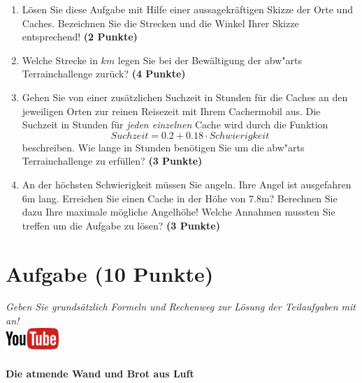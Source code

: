 \documentclass[a4paper, 9pt]{scrartcl}\usepackage[]{graphicx}\usepackage[]{xcolor}
\begin{document}
\begin{enumerate}
\item L{\"o}sen Sie diese Aufgabe mit Hilfe einer aussagekr{\"a}ftigen Skizze der
  Orte und Caches. Bezeichnen Sie die Strecken und die Winkel Ihrer Skizze
  entsprechend! \textbf{(2 Punkte)}
\item Welche Strecke in $km$ legen Sie bei der Bew{\"a}ltigung der
  abw{"a}rts Terrainchallenge zur{\"u}ck? \textbf{(4
    Punkte)}
\item Gehen Sie von einer zus{\"a}tzlichen Suchzeit in Stunden f{\"u}r die
  Caches an den jeweiligen Orten zur reinen Reisezeit mit Ihrem Cachermobil
  aus. Die Suchzeit in Stunden f{\"u}r \textit{jeden einzelnen} Cache wird durch die
  Funktion
  \begin{equation*}
    Suchzeit = 0.2 + 0.18 \cdot Schwierigkeit
  \end{equation*}  
  beschreiben.  Wie lange in Stunden ben{\"o}tigen Sie um die
  abw{"a}rts Terrainchallenge zu erf{\"u}llen? \textbf{(3 Punkte)}
\item An der h{\"o}chsten Schwierigkeit m{\"u}ssen Sie angeln. Ihre Angel ist
  ausgefahren 6m lang. Erreichen Sie einen Cache in der H{\"o}he
  von 7.8m?  Berechnen Sie dazu Ihre maximale m{\"o}gliche
  Angelh{\"o}he! Welche Annahmen mussten Sie treffen um die Aufgabe zu l{\"o}sen? \textbf{(3 Punkte)} 
\end{enumerate}

 
\clearpage

\section{Aufgabe \hfill (10 Punkte)}

\textit{Geben Sie grunds{\"a}tzlich Formeln und Rechenweg zur L{\"o}sung der
  Teilaufgaben mit an!} \\[1Ex]

\hfill\href{https://youtu.be/4-dSaPMhK9s}{\includegraphics[width =
  2cm]{img/youtube}} %
\hspace{2Ex}

\paragraph{Die atmende Wand und Brot aus Luft}
\end{document}

